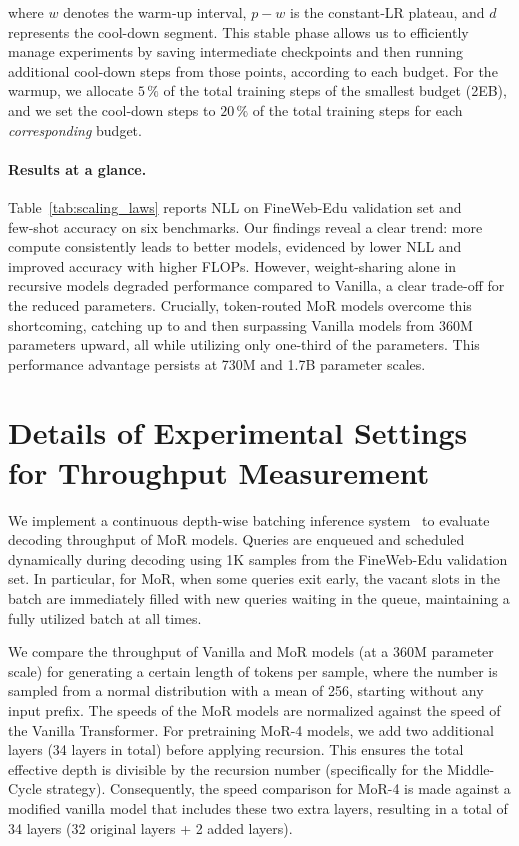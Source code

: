 where $w$ denotes the warm‑up interval, $p-w$ is the constant‑LR plateau, and $d$ represents the cool-down segment. This stable phase allows us to efficiently manage experiments by saving intermediate checkpoints and then running additional cool-down steps from those points, according to each budget. For the warmup, we allocate \(5\,\%\) of the total training steps of the smallest budget (2EB), and we set the cool‑down steps to \(20\,\%\) of the total training steps for each \emph{corresponding} budget.


\clearpage
\paragraph{Results at a glance.}
Table~\ref{tab:scaling_laws} reports NLL on FineWeb-Edu validation set and few‑shot accuracy on six benchmarks. Our findings reveal a clear trend: more compute consistently leads to better models, evidenced by lower NLL and improved accuracy with higher FLOPs. However, weight-sharing alone in recursive models degraded performance compared to Vanilla, a clear trade-off for the reduced parameters. Crucially, token-routed MoR models overcome this shortcoming, catching up to and then surpassing Vanilla models from 360M parameters upward, all while utilizing only one-third of the parameters. This performance advantage persists at 730M and 1.7B parameter scales.





\clearpage
\section{Details of Experimental Settings for Throughput Measurement}
\label{app:throughput}

We implement a continuous depth-wise batching inference system~\citep{bae2024relaxed, hooper2023speed} to evaluate decoding throughput of MoR models. Queries are enqueued and scheduled dynamically during decoding using 1K samples from the FineWeb-Edu validation set. In particular, for MoR, when some queries exit early, the vacant slots in the batch are immediately filled with new queries waiting in the queue, maintaining a fully utilized batch at all times.


We compare the throughput of Vanilla and MoR models (at a 360M parameter scale) for generating a certain length of tokens per sample, where the number is sampled from a normal distribution with a mean of 256, starting without any input prefix. The speeds of the MoR models are normalized against the speed of the Vanilla Transformer. For pretraining MoR-4 models, we add two additional layers (34 layers in total) before applying recursion. This ensures the total effective depth is divisible by the recursion number (specifically for the Middle-Cycle strategy). Consequently, the speed comparison for MoR-4 is made against a modified vanilla model that includes these two extra layers, resulting in a total of 34 layers (32 original layers + 2 added layers).


